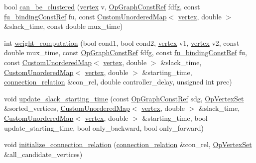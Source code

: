 \begin{DoxyCompactItemize}
\item 
bool \hyperlink{classcdfc__module__binding_a2986ac32a8bb871de7f5f06cd3cfc4da}{can\+\_\+be\+\_\+clustered} (\hyperlink{graph_8hpp_abefdcf0544e601805af44eca032cca14}{vertex} v, \hyperlink{op__graph_8hpp_a9a0b240622c47584bee6951a6f5de746}{Op\+Graph\+Const\+Ref} fdfg, const \hyperlink{fu__binding_8hpp_a61ca2120cd9d7839a550557a05fa776d}{fu\+\_\+binding\+Const\+Ref} fu, const \hyperlink{custom__map_8hpp_ad1ed68f2ff093683ab1a33522b144adc}{Custom\+Unordered\+Map}$<$ \hyperlink{graph_8hpp_abefdcf0544e601805af44eca032cca14}{vertex}, double $>$ \&slack\+\_\+time, const double mux\+\_\+time)
\item 
int \hyperlink{classcdfc__module__binding_ae26b6940aebc7b96eff2552c3f9e11b4}{weight\+\_\+computation} (bool cond1, bool cond2, \hyperlink{graph_8hpp_abefdcf0544e601805af44eca032cca14}{vertex} v1, \hyperlink{graph_8hpp_abefdcf0544e601805af44eca032cca14}{vertex} v2, const double mux\+\_\+time, const \hyperlink{op__graph_8hpp_a9a0b240622c47584bee6951a6f5de746}{Op\+Graph\+Const\+Ref} fdfg, const \hyperlink{fu__binding_8hpp_a61ca2120cd9d7839a550557a05fa776d}{fu\+\_\+binding\+Const\+Ref} fu, const \hyperlink{custom__map_8hpp_ad1ed68f2ff093683ab1a33522b144adc}{Custom\+Unordered\+Map}$<$ \hyperlink{graph_8hpp_abefdcf0544e601805af44eca032cca14}{vertex}, double $>$ \&slack\+\_\+time, \hyperlink{custom__map_8hpp_ad1ed68f2ff093683ab1a33522b144adc}{Custom\+Unordered\+Map}$<$ \hyperlink{graph_8hpp_abefdcf0544e601805af44eca032cca14}{vertex}, double $>$ \&starting\+\_\+time, \hyperlink{cdfc__module__binding_8hpp_add937cbd74df34342adc0bb9231809a8}{connection\+\_\+relation} \&con\+\_\+rel, double controller\+\_\+delay, unsigned int prec)
\item 
void \hyperlink{classcdfc__module__binding_a6988dcd248a68abd1ae2ee4982c8f503}{update\+\_\+slack\+\_\+starting\+\_\+time} (const \hyperlink{op__graph_8hpp_a9a0b240622c47584bee6951a6f5de746}{Op\+Graph\+Const\+Ref} sdg, \hyperlink{classOpVertexSet}{Op\+Vertex\+Set} \&sorted\+\_\+vertices, \hyperlink{custom__map_8hpp_ad1ed68f2ff093683ab1a33522b144adc}{Custom\+Unordered\+Map}$<$ \hyperlink{graph_8hpp_abefdcf0544e601805af44eca032cca14}{vertex}, double $>$ \&slack\+\_\+time, \hyperlink{custom__map_8hpp_ad1ed68f2ff093683ab1a33522b144adc}{Custom\+Unordered\+Map}$<$ \hyperlink{graph_8hpp_abefdcf0544e601805af44eca032cca14}{vertex}, double $>$ \&starting\+\_\+time, bool update\+\_\+starting\+\_\+time, bool only\+\_\+backward, bool only\+\_\+forward)
\item 
void \hyperlink{classcdfc__module__binding_a73c31494075a9cc9bfddb9e83bfd2dca}{initialize\+\_\+connection\+\_\+relation} (\hyperlink{cdfc__module__binding_8hpp_add937cbd74df34342adc0bb9231809a8}{connection\+\_\+relation} \&con\+\_\+rel, \hyperlink{classOpVertexSet}{Op\+Vertex\+Set} \&all\+\_\+candidate\+\_\+vertices)
\end{DoxyCompactItemize}
